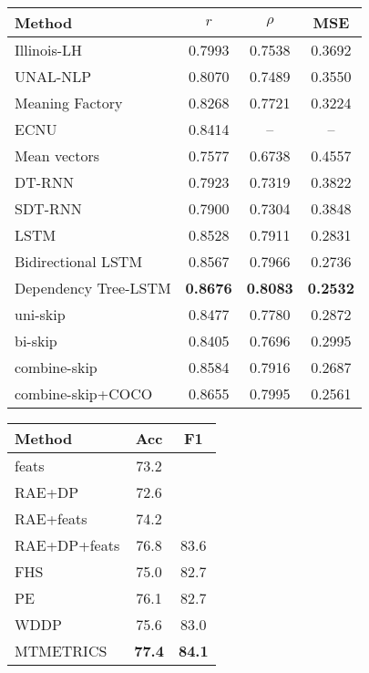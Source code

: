 \documentclass{article} \usepackage{nips15submit_e,times}
\begin{document}
\begin{table}
\small
\centering
\parbox{.6\linewidth}{
\begin{tabular}{lccc}
\toprule \bf Method & \bf $r$ & \bf $\rho$ & \bf MSE \\ \midrule
Illinois-LH \cite{lai2014illinois} & 0.7993  & 0.7538 & 0.3692 \\
UNAL-NLP \cite{jimenez2014unal} & 0.8070 & 0.7489 & 0.3550 \\
Meaning Factory \cite{bjerva2014meaning}  & 0.8268 & 0.7721 & 0.3224 \\
ECNU \cite{zhao2014ecnu} & 0.8414 & -- & -- \\ \midrule
Mean vectors \cite{tai2015improved} & 0.7577 & 0.6738 & 0.4557 \\
DT-RNN \cite{socher2014grounded} & 0.7923 & 0.7319 & 0.3822  \\
SDT-RNN \cite{socher2014grounded}  & 0.7900 & 0.7304 & 0.3848  \\
LSTM \cite{tai2015improved} & 0.8528 & 0.7911 & 0.2831 \\
Bidirectional LSTM \cite{tai2015improved} & 0.8567 & 0.7966 & 0.2736 \\
Dependency Tree-LSTM \cite{tai2015improved} & \textbf{0.8676} & \textbf{0.8083} & \textbf{0.2532} \\ \midrule
uni-skip   & 0.8477 & 0.7780 & 0.2872  \\
bi-skip & 0.8405 & 0.7696 & 0.2995 \\
combine-skip & 0.8584 & 0.7916 & 0.2687 \\ 
combine-skip+COCO & 0.8655 & 0.7995 & 0.2561 \\ \bottomrule
\end{tabular}
}
\centering
\parbox{.35\linewidth}{
\begin{tabular}{lcc}
\toprule \bf Method & \bf Acc & \bf F1 \\ \midrule
feats \cite{socher2011dynamic} & 73.2 & \\
RAE+DP \cite{socher2011dynamic} & 72.6 & \\
RAE+feats \cite{socher2011dynamic} & 74.2 & \\
RAE+DP+feats \cite{socher2011dynamic} & 76.8 & 83.6 \\ \midrule
FHS \cite{finch2005using} & 75.0 & 82.7 \\
PE \cite{das2009paraphrase}  & 76.1 & 82.7 \\ 
WDDP \cite{wan2006using} & 75.6 & 83.0 \\
MTMETRICS \cite{madnani2012re} & \textbf{77.4} & \textbf{84.1} \\ \midrule

\end{tabular}}
\end{table}
\end{document}
